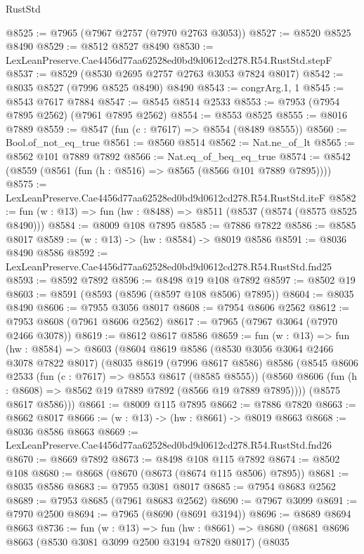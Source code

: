 \begin{lexlean}{RustStd}
\begin{coremodule}
@8525 := @7965 (@7967 @2757 (@7970 @2763 @3053))
@8527 := @8520 @8525 @8490
@8529 := @8512 @8527 @8490
@8530 := LexLeanPreserve.Cae4456d77aa62528ed0bd9d0612cd278.R54.RustStd.stepF
@8537 := @8529 (@8530 @2695 @2757 @2763 @3053 @7824 @8017)
@8542 := @8035 @8527 (@7996 @8525 @8490) @8490
@8543 := congrArg.{1, 1}
@8545 := @8543 @7617 @7884
@8547 := @8545 @8514 @2533
@8553 := @7953 (@7954 @7895 @2562) (@7961 @7895 @2562)
@8554 := @8553 @8525
@8555 := @8016 @7889
@8559 := @8547 (fun (c : @7617) => @8554 (@8489 @8555))
@8560 := Bool.of_not_eq_true
@8561 := @8560 @8514
@8562 := Nat.ne_of_lt
@8565 := @8562 @101 @7889 @7892
@8566 := Nat.eq_of_beq_eq_true
@8574 := @8542 (@8559 (@8561 (fun (h : @8516) => @8565 (@8566 @101 @7889 @7895))))
@8575 := LexLeanPreserve.Cae4456d77aa62528ed0bd9d0612cd278.R54.RustStd.iteF
@8582 := fun (w : @13) => fun (hw : @8488) => @8511 (@8537 (@8574 (@8575 @8525 @8490)))
@8584 := @8009 @108 @7895
@8585 := @7886 @7822
@8586 := @8585 @8017
@8589 := (w : @13) -> (hw : @8584) -> @8019 @8586
@8591 := @8036 @8490 @8586
@8592 := LexLeanPreserve.Cae4456d77aa62528ed0bd9d0612cd278.R54.RustStd.fnd25
@8593 := @8592 @7892
@8596 := @8498 @19 @108 @7892
@8597 := @8502 @19
@8603 := @8591 (@8593 (@8596 (@8597 @108 @8506) @7895))
@8604 := @8035 @8490
@8606 := @7955 @3056 @8017
@8608 := @7954 @8606 @2562
@8612 := @7953 @8608 (@7961 @8606 @2562)
@8617 := @7965 (@7967 @3064 (@7970 @2466 @3078))
@8619 := @8612 @8617 @8586
@8659 := fun (w : @13) =>
  fun (hw : @8584) =>
  @8603
    (@8604
      @8619
      @8586
      (@8530 @3056 @3064 @2466 @3078 @7822 @8017)
      (@8035
        @8619
        (@7996 @8617 @8586)
        @8586
        (@8545
          @8606
          @2533
          (fun (c : @7617) => @8553 @8617 (@8585 @8555))
          (@8560 @8606 (fun (h : @8608) => @8562 @19 @7889 @7892 (@8566 @19 @7889 @7895))))
        (@8575 @8617 @8586)))
@8661 := @8009 @115 @7895
@8662 := @7886 @7820
@8663 := @8662 @8017
@8666 := (w : @13) -> (hw : @8661) -> @8019 @8663
@8668 := @8036 @8586 @8663
@8669 := LexLeanPreserve.Cae4456d77aa62528ed0bd9d0612cd278.R54.RustStd.fnd26
@8670 := @8669 @7892
@8673 := @8498 @108 @115 @7892
@8674 := @8502 @108
@8680 := @8668 (@8670 (@8673 (@8674 @115 @8506) @7895))
@8681 := @8035 @8586
@8683 := @7955 @3081 @8017
@8685 := @7954 @8683 @2562
@8689 := @7953 @8685 (@7961 @8683 @2562)
@8690 := @7967 @3099
@8691 := @7970 @2500
@8694 := @7965 (@8690 (@8691 @3194))
@8696 := @8689 @8694 @8663
@8736 := fun (w : @13) =>
  fun (hw : @8661) =>
  @8680
    (@8681
      @8696
      @8663
      (@8530 @3081 @3099 @2500 @3194 @7820 @8017)
      (@8035

\end{coremodule}
\end{lexlean}
